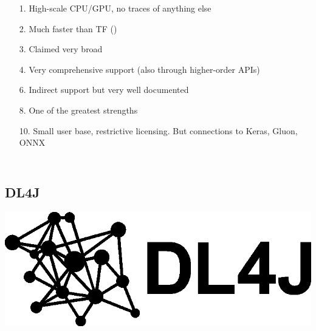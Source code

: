 \documentclass[hyperref={pdfpagelabels=false}]{beamer}
\begin{document}
\begin{frame}
\begin{columns}[t]
\begin{tikzpicture}
         \end{tikzpicture}
         \begin{itemize}
         \item[\scriptsize{\textcolor{visiblered}{1.}}] \scriptsize{High-scale CPU/GPU, no traces of anything else}
         \item[\scriptsize{\textcolor{visiblered}{2.}}] \scriptsize{Much faster than TF (\cite{chainer-benchmarks})}
         \item[\scriptsize{\textcolor{visiblegreen}{3.}}] \scriptsize{Claimed very broad\cite{cntk-web}}
         \item[\scriptsize{\textcolor{visiblegreen}{4.}}] \scriptsize{Very comprehensive support (also through higher-order APIs)}
         \item[\scriptsize{\textcolor{visiblegreen}{6.}}] \scriptsize{Indirect support but very well documented}
         \item[\scriptsize{\textcolor{visibleblue}{8.}}] \scriptsize{One of the greatest strengths}
         \item[\scriptsize{\textcolor{visibleblue}{10.}}] \scriptsize{Small user base, restrictive licensing. But connections to Keras, Gluon, ONNX}
         \end{itemize}
          \end{columns}
     \end{frame}


     \subsection{DL4J} %
     \begin{frame}[c] %
       \begin{center}
         \vspace{8mm}
         \includegraphics[scale=0.17]{logo_dl4j.png}
       \end{center}
     \end{frame}
     
\end{document}
